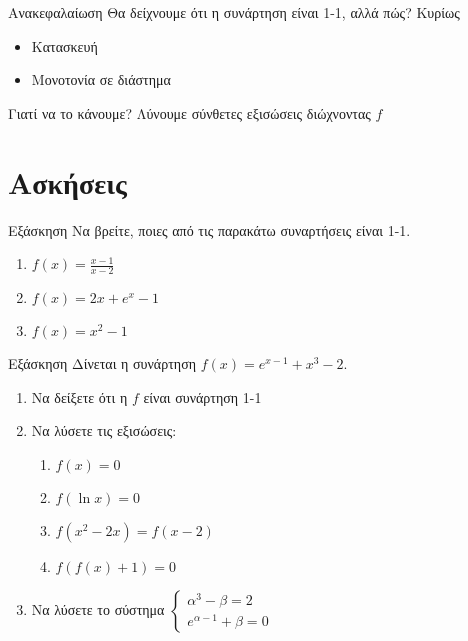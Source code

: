 \documentclass{presentation}
\begin{document}
\begin{frame}{Ανακεφαλαίωση}
  Θα δείχνουμε ότι η συνάρτηση είναι 1-1, αλλά πώς? \pause
  Κυρίως
  \begin{itemize}
    \item Κατασκευή \pause
    \item Μονοτονία σε διάστημα
  \end{itemize} \pause
  \begin{alertblock}{Γιατί να το κάνουμε?}
    Λύνουμε σύνθετες εξισώσεις διώχνοντας $f$
  \end{alertblock}
\end{frame}

\section{Ασκήσεις}
\begin{frame}{Εξάσκηση}
  Να βρείτε, ποιες από τις  παρακάτω συναρτήσεις είναι 1-1.
  \begin{enumerate}
    \item $f(x)=\frac{x-1}{x-2}$\pause
    \item $f(x)=2x+e^x-1$\pause
    \item $f(x)=x^2-1$
  \end{enumerate}
\end{frame}

\begin{frame}{Εξάσκηση}
  Δίνεται η συνάρτηση $f(x)=e^{x-1}+x^3-2$.
  \begin{enumerate}
    \item Να δείξετε ότι η $f$ είναι συνάρτηση 1-1 \pause
    \item Να λύσετε τις εξισώσεις:
          \begin{enumerate}
            \item $f(x)=0$ \pause
            \item $f(\ln x)=0$ \pause
            \item $f(x^2-2x)=f(x-2)$ \pause
            \item $f\left(f(x)+1\right)=0$ \pause
          \end{enumerate}
    \item Να λύσετε το σύστημα $\begin{cases}
              α^3-β=2 \\
              e^{α-1}+β=0
            \end{cases}$
  \end{enumerate}
\end{frame}
\end{document}
